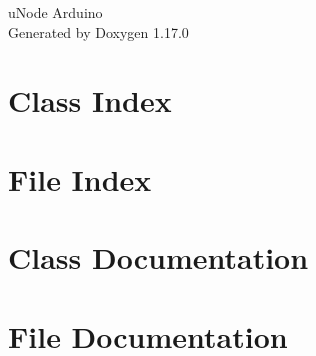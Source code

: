 \documentclass[twoside]{book}
\newcommand{\+}{\discretionary{\mbox{\scriptsize$\hookleftarrow$}}{}{}}
\newcommand{\clearemptydoublepage}{%
    \newpage{\pagestyle{empty}\cleardoublepage}%
  }
\begin{document}
  \raggedbottom
    \hypersetup{pageanchor=false,
                bookmarksnumbered=true,
                pdfencoding=unicode
               }
  \begin{titlepage}
  \vspace*{7cm}
  \begin{center}%
  {\Large u\+Node Arduino}\\
  \vspace*{1cm}
  {\large Generated by Doxygen 1.17.0}\\
  \end{center}
  \end{titlepage}
  \clearemptydoublepage
  \tableofcontents
  \clearemptydoublepage
  \hypersetup{pageanchor=true}
\chapter{Class Index}

\chapter{File Index}

\chapter{Class Documentation}






\chapter{File Documentation}
















  \backmatter
  \newpage
  \clearemptydoublepage
  \printindex
\end{document}
